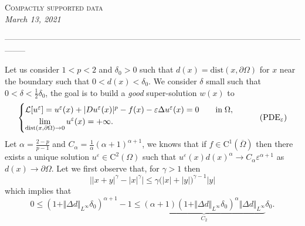 \documentclass[10pt]{article}
\newcommand{\setfont}[2]{{\fontfamily{#1}\selectfont #2}}
\theoremstyle{plain}
\theoremstyle{remark}
\begin{document}
\begin{center}
{\LARGE \textsc{Compactly supported data}}\\
{\textit{March 13, 2021}}
\end{center}



\begin{center}
--------------------------------------------------------------------------------------------------------------------
\end{center}


\noindent
Let us consider $1<p<2$ and $\delta_0>0$ such that $d(x) = \mathrm{dist}(x,\partial\Omega)$ for $x$ near the boundary such that $0<d(x)<\delta_0$. We consider $\delta$ small such that $0<\delta < \frac{1}{2}\delta_0$, the goal is to build a \emph{good} super-solution $w(x)$ to 
\begin{equation}\label{eq:PDEeps}
    \begin{cases}
   \mathcal{L}[u^\varepsilon] =  u^\varepsilon(x) + |Du^\varepsilon(x)|^p - f(x) - \varepsilon \Delta u^\varepsilon(x) = 0 \qquad
    \text{in}\;\Omega, \vspace{0cm}\\
    \displaystyle  \lim_{\mathrm{dist}(x,\partial \Omega)\to 0} u^\varepsilon(x) = +\infty.
    \end{cases} \tag{PDE$_\varepsilon$}
\end{equation}
Let $\alpha = \frac{2-p}{p-1}$ and $C_\alpha = \frac{1}{\alpha}(\alpha+1)^{\alpha+1}$, we knows that if $f\in \mathrm{C}^1(\overline{\Omega})$ then there exists a unique solution $u^\varepsilon\in \mathrm{C}^2(\Omega)$ such that $u^\varepsilon(x)d(x)^\alpha \to C_\alpha \varepsilon^{\alpha+1}$ as $d(x)\to \partial\Omega$. Let  we first observe that, for $\gamma>1$ then
\begin{equation*}
    \Big||x+y|^\gamma - |x|^\gamma\Big|\leq \gamma\Big(|x|+|y|\Big)^{\gamma-1}|y|
\end{equation*}
which implies that
\begin{equation*}
     0 \leq (1+\Vert \Delta d\Vert_{L^\infty}\delta_0)^{\alpha+1} - 1 \leq\underbrace{(\alpha+1)\left(1+\Vert \Delta d\Vert_{L^\infty}\delta_0\right)^\alpha \Vert \Delta d\Vert_{L^\infty}}_{C_2}\delta_0.
\end{equation*}
\end{document}
